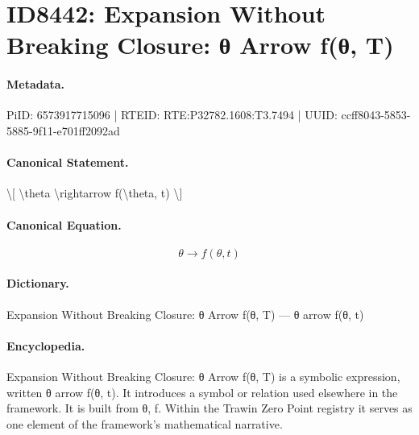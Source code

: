 \section*{ID8442: Expansion Without Breaking Closure: θ Arrow f(θ, T)}
\paragraph{Metadata.}
PiID: 6573917715096 | RTEID: RTE:P32782.1608:T3.7494 | UUID: ccff8043-5853-5885-9f11-e701ff2092ad

\paragraph{Canonical Statement.}
\textbackslash{}[ \textbackslash{}theta \textbackslash{}rightarrow f(\textbackslash{}theta, t) \textbackslash{}]

\paragraph{Canonical Equation.}
\[
\theta \rightarrow f(\theta, t)
\]

\paragraph{Dictionary.}
Expansion Without Breaking Closure: θ Arrow f(θ, T) — θ arrow f(θ, t)

\paragraph{Encyclopedia.}
Expansion Without Breaking Closure: θ Arrow f(θ, T) is a symbolic expression, written θ arrow f(θ, t). It introduces a symbol or relation used elsewhere in the framework. It is built from θ, f. Within the Trawin Zero Point registry it serves as one element of the framework's mathematical narrative.
